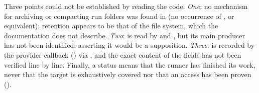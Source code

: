 Three points could not be established by reading the code. \emph{One}: no
mechanism for archiving or compacting run folders was found in  (no
occurrence of ,  or equivalent);
retention appears to be that of the file system, which the documentation does not
describe. \emph{Two}:  is read by
 and , but its main
producer has not been identified; asserting it would be a supposition.
\emph{Three}:  is recorded by the provider callback
() via , and the exact content of
the fields has not been verified line by line. Finally, a  status
means that the runner has finished its work, never that the target is exhaustively
covered nor that an access has been proven
().
